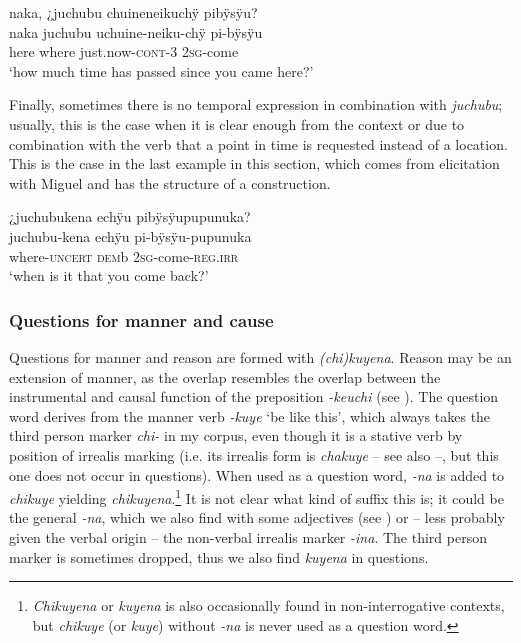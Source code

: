 \ea\label{ex:when-3}
\begingl
\glpreamble naka, ¿juchubu chuineneikuchÿ pibÿsÿu?\\
\gla naka juchubu uchuine-neiku-chÿ pi-bÿsÿu\\
\glb here where just.now-\textsc{cont}-3 2\textsc{sg}-come\\
\glft ‘how much time has passed since you came here?’
\endgl
\trailingcitation{[jxx-e150925l-1.038]}
\xe

Finally, sometimes there is no temporal expression in combination with \textit{juchubu}; usually, this is the case when it is clear enough from the context or due to combination with the verb that a point in time is requested instead of a location. This is the case in the last example in this section, which comes from elicitation with Miguel and has the structure of a  construction.

\ea\label{ex:when-4}
\begingl
\glpreamble ¿juchubukena echÿu pibÿsÿupupunuka?\\
\gla juchubu-kena echÿu pi-bÿsÿu-pupunuka\\
\glb where-\textsc{uncert} \textsc{dem}b 2\textsc{sg}-come-\textsc{reg.irr}\\
\glft ‘when is it that you come back?’
\endgl
\trailingcitation{[mxx-e090728s-1.48]}
\xe

\subsubsection{Questions for manner and cause}\label{sec:Q_chikuyena}

Questions for manner and reason are formed with \textit{(chi)kuyena}. Reason may be an extension of manner, as the overlap resembles the overlap between the instrumental and causal function of the preposition \textit{-keuchi} (see ). The question word derives from the manner verb \textit{-kuye} ‘be like this’, which always takes the third person marker \textit{chi-} in my corpus, even though it is a stative verb by position of irrealis marking (i.e. its irrealis form is \textit{chakuye} – see also  –, but this one does not occur in questions). When used as a question word, \textit{-na} is added to \textit{chikuye} yielding \textit{chikuyena}.\footnote{\textit{Chikuyena} or \textit{kuyena} is also occasionally found in non-interrogative contexts, but \textit{chikuye} (or \textit{kuye}) without \textit{-na} is never used as a question word.} It is not clear what kind of suffix this is; it could be the general  \textit{-na}, which we also find with some adjectives (see ) or – less probably given the verbal origin – the non-verbal irrealis marker \textit{-ina}. The third person marker is sometimes dropped, thus we also find \textit{kuyena} in questions. 


